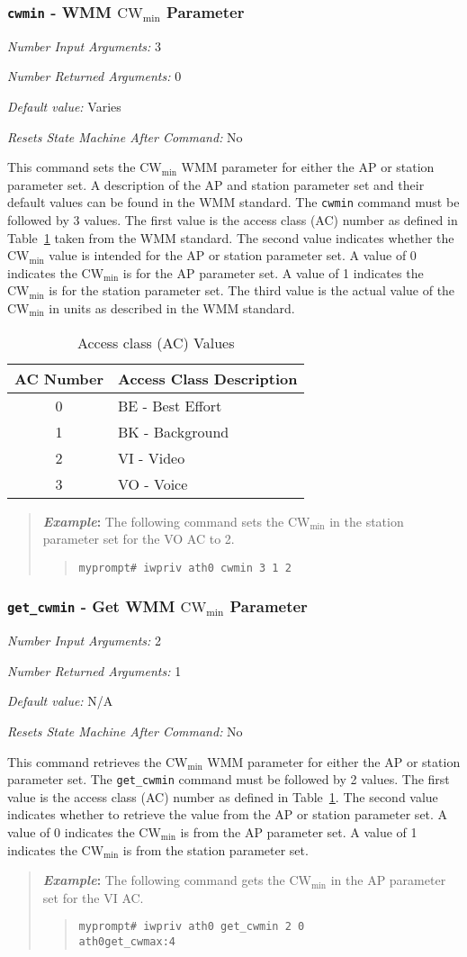 \documentclass[10pt,fullpage]{article}
\newcommand{\mytt}[1]{{\texttt{#1}}}
\newcommand{\bv}{\begin{verse}}
\newcommand{\ev}{\end{verse}}
\newcommand{\cmd}[1]{{\texttt{myprompt\# #1}}}
\newcommand{\argdesc}[4]{\begin{description}
\itemsep -6pt
\item \textit{Number Input Arguments:} #1
\item \textit{Number Returned Arguments:} #2
\item \textit{Default value:} #3
\item \textit{Resets State Machine After Command:} #4
\end{description}
}
\newenvironment{example}{\begin{quote}\textbf{\textit{Example}:}}{\end{quote}}
\begin{document}
\subsubsection{\mytt{cwmin} - WMM $\mathrm{CW}_{\mathrm{min}}$ Parameter}
\argdesc{3}{0}{Varies}{No}
This command sets the $\mathrm{CW}_{\mathrm{min}}$ WMM parameter for
either the AP or station parameter set.  A description of the AP and
station parameter set and their default values can be found in the WMM
standard.  The \mytt{cwmin} command must be followed by 3 values.  The
first value is the access class (AC) number as defined in
Table~\ref{tab:acvalues} taken from the WMM standard.  The second
value indicates whether the $\mathrm{CW}_{\mathrm{min}}$ value is
intended for the AP or station parameter set.  A value of 0 indicates
the $\mathrm{CW}_{\mathrm{min}}$ is for the AP parameter set.  A value
of 1 indicates the $\mathrm{CW}_{\mathrm{min}}$ is for the station
parameter set.  The third value is the actual value of the
$\mathrm{CW}_{\mathrm{min}}$ in units as described in the WMM
standard.
\begin{table}[h*]
  \centering
  \begin{tabular}{|c|l|} \hline
    AC Number & Access Class Description \\ \hline
    0 & BE - Best Effort \\
    1 & BK - Background \\
    2 & VI - Video \\
    3 & VO - Voice \\ \hline
  \end{tabular}
  \caption{Access class (AC) Values}
  \label{tab:acvalues}
\end{table}
\begin{example}
  The following command sets the $\mathrm{CW}_{\mathrm{min}}$ in the
  station parameter set for the VO AC to 2.
  \bv
  \cmd{iwpriv ath0 cwmin 3 1 2}
  \ev
\end{example}

\subsubsection{\mytt{get\_cwmin} - Get WMM $\mathrm{CW}_{\mathrm{min}}$ Parameter}
\argdesc{2}{1}{N/A}{No}
This command retrieves the $\mathrm{CW}_{\mathrm{min}}$ WMM parameter
for either the AP or station parameter set.  The \mytt{get\_cwmin}
command must be followed by 2 values.  The first value is the access
class (AC) number as defined in Table~\ref{tab:acvalues}.  The second
value indicates whether to retrieve the value from the AP or station
parameter set.  A value of 0 indicates the
$\mathrm{CW}_{\mathrm{min}}$ is from the AP parameter set.  A value of
1 indicates the $\mathrm{CW}_{\mathrm{min}}$ is from the station
parameter set.
\begin{example}
  The following command gets the $\mathrm{CW}_{\mathrm{min}}$ in the
  AP parameter set for the VI AC.
  \bv
  \cmd{iwpriv ath0 get\_cwmin 2 0}\\
  \mytt{ath0\hspace{32pt}get\_cwmax:4}
\ev
\end{example}
\end{document}
